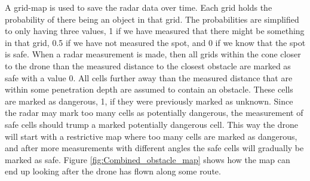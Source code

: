 A grid-map is used to save the radar data over time. Each grid holds the probability of there being an object in that grid. The probabilities are simplified to only having three values,  1 if we have measured that there might be something in that grid, 0.5 if we have not measured the spot, and 0 if we know that the spot is safe. When a radar measurement is made, then all grids within the cone closer to the drone than the measured distance to the closest obstacle are marked as safe with a value 0. All cells further away than the measured distance that are within some penetration depth are assumed to contain an obstacle. These cells are marked as dangerous, 1, if they were previously marked as unknown. Since the radar may mark too many cells as potentially dangerous, the measurement of safe cells should trump a marked potentially dangerous cell. This way the drone will start with a restrictive map where too many cells are marked as dangerous, and after more measurements with different angles the safe cells will gradually be marked as safe.  Figure \ref{fig:Combined_obstacle_map} shows how the map can end up looking after the drone has flown along some route. 

